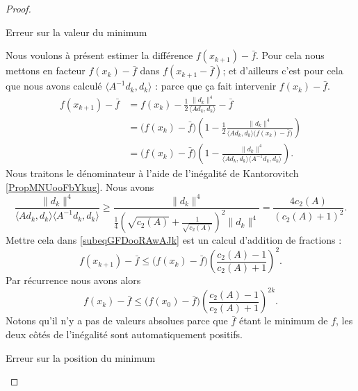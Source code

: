 \begin{proof}
\begin{subproof}
        \item[Erreur sur la valeur du minimum]

            Nous voulons à présent estimer la différence \( f(x_{k+1})-\bar f\). Pour cela nous mettons en facteur \( f(x_k)-\bar f\) dans \( f(x_{k+1}-\bar f)\); et d'ailleurs c'est pour cela que nous avons calculé \( \langle A^{-1}d_k, d_k\rangle \) : parce que ça fait intervenir \( f(x_k)-\bar f\).
            \begin{subequations}
                \begin{align}
                    f(x_{k+1})-\bar f&=f(x_k)-\frac{ 1 }{2}\frac{ \| d_k \|^4 }{ \langle Ad_k, d_k\rangle  }-\bar f\\
                    &=\big( f(x_k)-\bar f \big)\left( 1-\frac{ 1 }{2}\frac{ \| d_k \|^{4} }{ \langle Ad_k, d_k\rangle \big( f(x_k)-\bar f \big) } \right)\\
                    &=\big( f(x_k)-\bar f \big)\left( 1-\frac{ \| d_k \|^{4} }{ \langle Ad_k, d_k\rangle \langle A^{-1}d_k, d_k\rangle  } \right).\label{subeqGFDooRAwAJk}
                \end{align}
            \end{subequations}
            Nous traitons le dénominateur à l'aide de l'inégalité de Kantorovitch \ref{PropMNUooFbYkug}. Nous avons
            \begin{equation}
                \frac{ \| d_k \|^4 }{ \langle Ad_k, d_k\rangle \langle A^{-1}d_k, d_k\rangle  }\geq \frac{ \| d_k \|^4 }{ \frac{1}{ 4 }\left( \sqrt{c_2(A)}+\frac{1}{ \sqrt{c_2(A)} } \right)^2\| d_k \|^4 }=\frac{ 4c_2(A) }{ (c_2(A)+1)^2 }.
            \end{equation}
            Mettre cela dans \eqref{subeqGFDooRAwAJk} est un calcul d'addition de fractions :
            \begin{equation}
                f(x_{k+1})-\bar f\leq \big( f(x_k)-\bar f \big)\left( \frac{ c_2(A)-1 }{ c_2(A)+1 } \right)^2.
            \end{equation}
            Par récurrence nous avons alors
            \begin{equation}    \label{eqANKooNPfCFj}
                f(x_k)-\bar f\leq \big( f(x_0)-\bar f \big)\left( \frac{ c_2(A)-1 }{ c_2(A)+1 } \right)^{2k}.
            \end{equation}
            Notons qu'il n'y a pas de valeurs absolues parce que \( \bar f\) étant le minimum de \( f\), les deux côtés de l'inégalité sont automatiquement positifs.

        \item[Erreur sur la position du minimum]


\end{subproof}
\end{proof}

